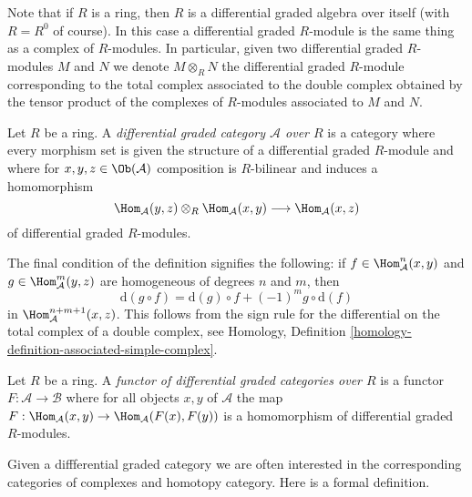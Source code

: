 \noindent
Note that if $R$ is a ring, then $R$ is a differential graded algebra
over itself (with $R = R^0$ of course). In this case a differential
graded $R$-module is the same thing as a complex of $R$-modules.
In particular, given two differential graded $R$-modules $M$ and $N$
we denote $M \otimes_R N$ the differential graded $R$-module
corresponding to the total complex associated to the double
complex obtained by the tensor product of the complexes of $R$-modules
associated to $M$ and $N$.

\begin{definition}
\label{definition-dga-category}
Let $R$ be a ring. A {\it differential graded category $\mathcal{A}$
over $R$} is a category where every morphism set is given the structure
of a differential graded $R$-module and where for
$x, y, z \in \Ob(\mathcal{A})$ composition is $R$-bilinear and induces
a homomorphism
$$
\Hom_\mathcal{A}(y, z) \otimes_R \Hom_\mathcal{A}(x, y)
\longrightarrow
\Hom_\mathcal{A}(x, z)
$$
of differential graded $R$-modules.
\end{definition}

\noindent
The final condition of the definition signifies the following:
if $f \in \Hom_\mathcal{A}^n(x, y)$ and
$g \in \Hom_\mathcal{A}^m(y, z)$ are homogeneous
of degrees $n$ and $m$, then
$$
\text{d}(g \circ f) = \text{d}(g) \circ f + (-1)^mg \circ \text{d}(f)
$$
in $\Hom_\mathcal{A}^{n + m + 1}(x, z)$. This follows from the sign
rule for the differential on the total complex of a double complex, see
Homology, Definition \ref{homology-definition-associated-simple-complex}.

\begin{definition}
\label{definition-functor-dga-categories}
Let $R$ be a ring. A {\it functor of differential graded categories over $R$}
is a functor $F : \mathcal{A} \to \mathcal{B}$ where for all objects
$x, y$ of $\mathcal{A}$ the map
$F : \Hom_\mathcal{A}(x, y) \to \Hom_\mathcal{A}(F(x), F(y))$
is a homomorphism of differential graded $R$-modules.
\end{definition}

\noindent
Given a diffferential graded category we are often interested in the
corresponding categories of complexes and homotopy category.
Here is a formal definition.

